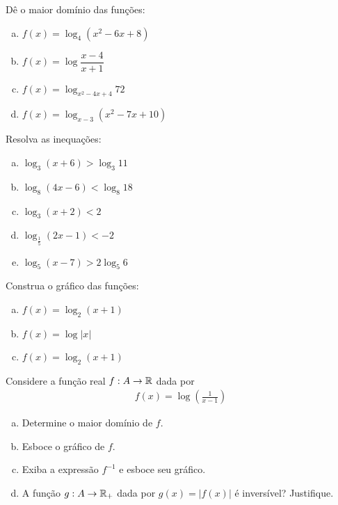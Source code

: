 \begin{secExercicios}
\begin{exer}
    Dê o maior domínio das funções:
    \begin{enumerate}[a)]
        \item $f(x)=\log_4 (x^2-6x+8)$
        \item $f(x)=\log \dfrac{x-4}{x+1}$
        \item $f(x)=\log_{x^2-4x+4} 72$
        \item $f(x)=\log_{x-3} (x^2-7x+10)$
    \end{enumerate}
\end{exer}

\begin{exer}
    Resolva as inequações:
    \begin{enumerate}[a)]
        \item $\log_3(x+6)>\log_3 11$
        \item $\log_8(4x-6)<\log_8 18$
        \item $\log_3(x+2)<2$
        \item $\log_{\frac{1}{5}}(2x-1)<-2$
        \item $\log_5(x-7)>2 \log_5 6$
    \end{enumerate}
\end{exer}

\begin{exer}
    Construa o gráfico das funções:
    \begin{enumerate}[a)]
        \item $f(x)=\log_2 (x+1)$
        \item $f(x)=\log |x|$
        \item $f(x)=\log_2 (x+1)$
    \end{enumerate}
\end{exer}

\begin{exer}
    Considere a função  real $f: A \to \mathbb{R}$ dada por
    \begin{align*}
    f(x) = \log\left(\frac{1}{x-1}\right)
    \end{align*}
    
    \begin{enumerate}[a)]
    \item Determine o maior domínio de $f$.
    \item Esboce o gráfico de $f$.
    \item Exiba a expressão $f^{-1}$ e esboce seu gráfico.
    \item A função $g: A\to \mathbb{R}_{+}$ dada por $g(x) = |f(x)|$ é inversível? Justifique.
    \end{enumerate}
\end{exer}


\end{secExercicios}
